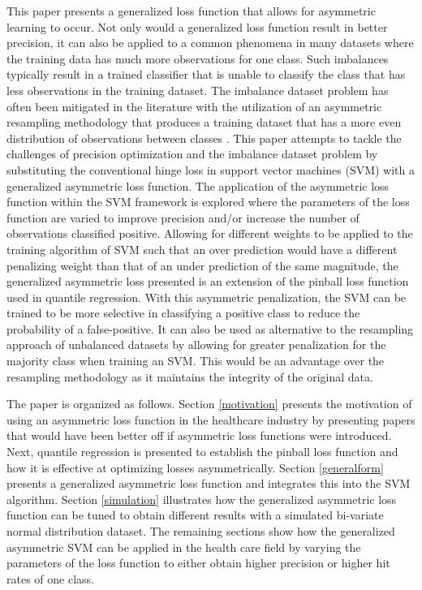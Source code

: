 \documentclass[twoside,11pt]{article}
\begin{document}
This paper presents a generalized loss function that allows for asymmetric learning to occur. Not only would a generalized loss function result in better precision, it can also be applied to a common phenomena in many datasets where the training data has much more observations for one class. Such imbalances typically result in a trained classifier that is unable to classify the class that has less observations in the training dataset. The imbalance dataset problem has often been mitigated in the literature with the utilization of an asymmetric resampling methodology that produces a training dataset that has a more even distribution of observations between classes \citep{Hamed04}. This paper attempts to tackle the challenges of precision optimization and the imbalance dataset problem by substituting the conventional hinge loss in support vector machines (SVM) with a generalized asymmetric loss function. The application of the asymmetric loss function within the SVM framework is explored where the parameters of the loss function are varied to improve precision and/or increase the number of observations classified positive. Allowing for different weights to be applied to the training algorithm of SVM such that an over prediction would have a different penalizing weight than that of an under prediction of the same magnitude, the generalized asymmetric loss presented is an extension of the pinball loss function \citep{Steinwart07} used in quantile regression. With this asymmetric penalization, the SVM can be trained to be more selective in classifying a positive class to reduce the probability of a false-positive. It can also be used as alternative to the resampling approach of unbalanced datasets by allowing for greater penalization for the majority class when training an SVM. This would be an advantage over the resampling methodology as it maintains the integrity of the original data.

The paper is organized as follows. Section \ref{motivation} presents the motivation of using an asymmetric loss function in the healthcare industry by presenting papers that would have been better off if asymmetric loss functions were introduced. Next, quantile regression is presented to establish the pinball loss function and how it is effective at optimizing losses asymmetrically. Section \ref{generalform} presents a generalized asymmetric loss function and integrates this into the SVM algorithm. Section \ref{simulation} illustrates how the generalized asymmetric loss function can be tuned to obtain different results with a simulated bi-variate normal distribution dataset. The remaining sections show how the generalized asymmetric SVM can be applied in the health care field by varying the parameters of the loss function to either obtain higher precision or higher hit rates of one class.
\end{document}
